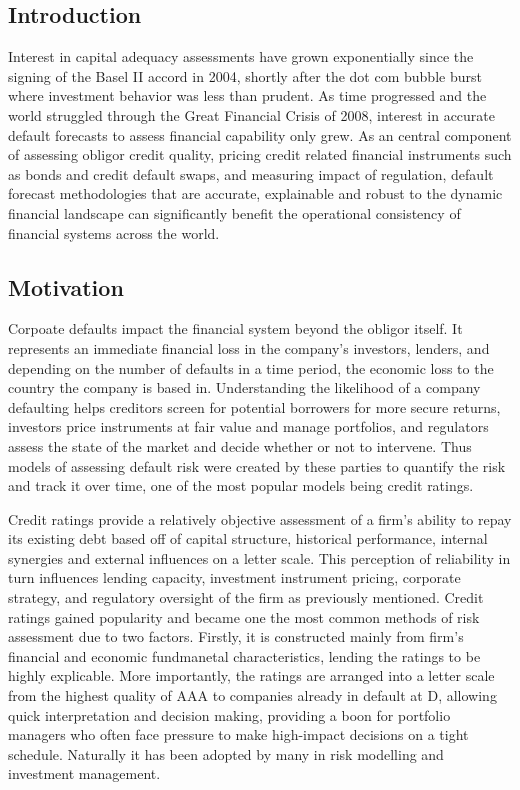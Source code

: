 \documentclass[10pt]{article}
\begin{document}
\begin{multicols*}{2}

\section{Introduction}\label{introduction}

Interest in capital adequacy assessments have grown exponentially since the signing of the Basel II accord in 2004, shortly after the dot com bubble burst where investment behavior was less than prudent.
As time progressed and the world struggled through the Great Financial Crisis of 2008, interest in accurate default forecasts to assess financial capability only grew. As an central component of assessing obligor credit quality,
pricing credit related financial instruments such as bonds and credit default swaps, and measuring impact of regulation, default forecast methodologies that are accurate, explainable and robust to the dynamic financial landscape can significantly benefit the operational consistency of financial systems across the world.  
 
\subsection{Motivation}\label{motivation}

Corpoate defaults impact the financial system beyond the obligor itself. It represents an immediate financial loss in the company's investors, lenders, and depending on the number of defaults in a time period, the economic loss to the country the company is based in.
Understanding the likelihood of a company defaulting helps creditors screen for potential borrowers for more secure returns, investors price instruments at fair value and manage portfolios, and regulators assess the state of the market and decide whether or not to intervene.
Thus models of assessing default risk were created by these parties to quantify the risk and track it over time, one of the most popular models being credit ratings.  

Credit ratings provide a relatively objective assessment of a firm's ability to repay its existing debt based off of capital structure, historical performance, internal synergies and external influences on a letter scale.
This perception of reliability in turn influences lending capacity, investment instrument pricing, corporate strategy, and regulatory oversight of the firm as previously mentioned. 
Credit ratings gained popularity and became one the most common methods of risk assessment due to two factors. Firstly, it is constructed mainly from firm's financial and economic fundmanetal characteristics, lending the ratings to be highly explicable.
More importantly, the ratings are arranged into a letter scale from the highest quality of AAA to companies already in default at D, allowing quick interpretation and decision making, providing a boon for portfolio managers who often face pressure to make high-impact decisions on a tight schedule.
Naturally it has been adopted by many in risk modelling and investment management.


\end{multicols*}
\end{document}
